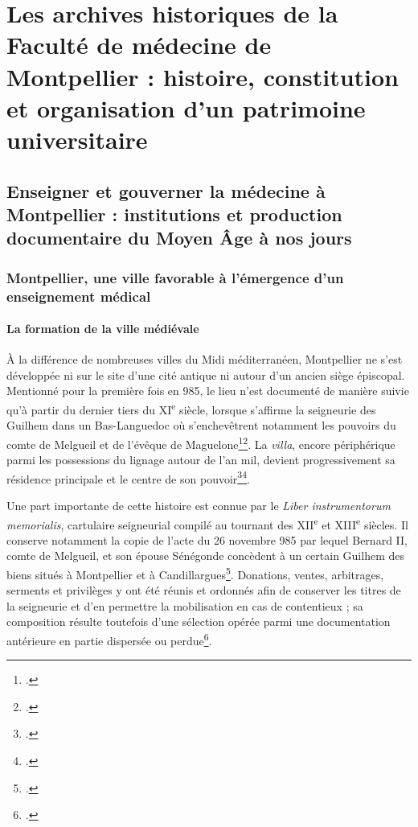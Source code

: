 \part{Les archives historiques de la Faculté de médecine de Montpellier :
	histoire, constitution et organisation d'un patrimoine universitaire}

\chapter{Enseigner et gouverner la médecine à Montpellier :
	institutions et production documentaire du Moyen Âge à nos jours}

\section{Montpellier, une ville favorable à l'émergence d'un enseignement médical}

\subsection{La formation de la ville médiévale}

À la différence de nombreuses villes du Midi méditerranéen, Montpellier ne s'est développée ni sur le site d'une cité antique ni autour d'un ancien siège épiscopal. Mentionné pour la première fois en 985, le lieu n'est documenté de manière suivie qu'à partir du dernier tiers du XI\textsuperscript{e} siècle, lorsque s'affirme la seigneurie des Guilhem dans un Bas-Languedoc où s'enchevêtrent notamment les pouvoirs du comte de Melgueil et de l'évêque de Maguelone\footcite{DuhamelAmado1991}\footcite{Katsura1992}. La \emph{villa}, encore périphérique parmi les possessions du lignage autour de l'an mil, devient progressivement sa résidence principale et le centre de son pouvoir\footcite{Vidal1986Donation}\footcite{DuhamelAmado1991}.

Une part importante de cette histoire est connue par le \emph{Liber instrumentorum memorialis}, cartulaire seigneurial compilé au tournant des XII\textsuperscript{e} et XIII\textsuperscript{e} siècles. Il conserve notamment la copie de l'acte du 26 novembre 985 par lequel Bernard II, comte de Melgueil, et son épouse Sénégonde concèdent à un certain Guilhem des biens situés à Montpellier et à Candillargues\footcite[fol.~29~v°, \emph{Carta donacionis feudi, quod contulit Bernardus comes, cum uxore sua, Guillelmo, domino Montispessulani}, vue~36/225 de la version numérisée]{MontpellierAMAA1}. Donations, ventes, arbitrages, serments et privilèges y ont été réunis et ordonnés afin de conserver les titres de la seigneurie et d'en permettre la mobilisation en cas de contentieux ; sa composition résulte toutefois d'une sélection opérée parmi une documentation antérieure en partie dispersée ou perdue\footcite{Chastang2006Liber}.

